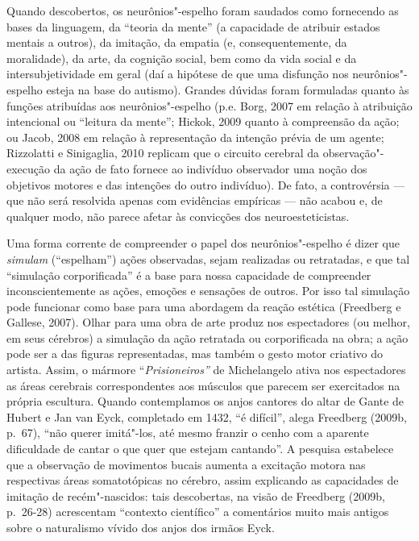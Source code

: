 Quando descobertos, os neurônios"-espelho foram saudados como fornecendo
as bases da linguagem, da ``teoria da mente'' (a capacidade de atribuir
estados mentais a outros), da imitação, da empatia (e, consequentemente,
da moralidade), da arte, da cognição social, bem como da vida social e
da intersubjetividade em geral (daí a hipótese de que uma disfunção nos
neurônios"-espelho esteja na base do autismo). Grandes dúvidas foram
formuladas quanto às funções atribuídas aos neurônios"-espelho (p.e.
Borg, 2007 em relação à atribuição intencional ou ``leitura da mente'';
Hickok, 2009 quanto à compreensão da ação; ou Jacob, 2008 em relação à
representação da intenção prévia de um agente; Rizzolatti e Sinigaglia,
2010 replicam que o circuito cerebral da observação"-execução da ação de
fato fornece ao indivíduo observador uma noção dos objetivos motores e
das intenções do outro indivíduo). De fato, a controvérsia --- que não
será resolvida apenas com evidências empíricas --- não acabou e, de
qualquer modo, não parece afetar às convicções dos neuroesteticistas.

Uma forma corrente de compreender o papel dos neurônios"-espelho é dizer
que \emph{simulam} (``espelham'') ações observadas, sejam realizadas ou
retratadas, e que tal ``simulação corporificada'' é a base para nossa
capacidade de compreender inconscientemente as ações, emoções e
sensações de outros. Por isso tal simulação pode funcionar como base
para uma abordagem da reação estética (Freedberg e Gallese, 2007). Olhar
para uma obra de arte produz nos espectadores (ou melhor, em seus
cérebros) a simulação da ação retratada ou corporificada na obra; a ação
pode ser a das figuras representadas, mas também o gesto motor criativo
do artista. Assim, o mármore ``\emph{Prisioneiros''} de Michelangelo
ativa nos espectadores as áreas cerebrais correspondentes aos músculos
que parecem ser exercitados na própria escultura. Quando contemplamos os
anjos cantores do altar de Gante de Hubert e Jan van Eyck, completado em
1432, ``é difícil'', alega Freedberg (2009b, p.~67), ``não querer
imitá"-los, até mesmo franzir o cenho com a aparente dificuldade de
cantar o que quer que estejam cantando''. A pesquisa estabelece que a
observação de movimentos bucais aumenta a excitação motora nas
respectivas áreas somatotópicas no cérebro, assim explicando as
capacidades de imitação de recém"-nascidos: tais descobertas, na visão de
Freedberg (2009b, p.~26-28) acrescentam ``contexto científico'' a
comentários muito mais antigos sobre o naturalismo vívido dos anjos dos
irmãos Eyck.

